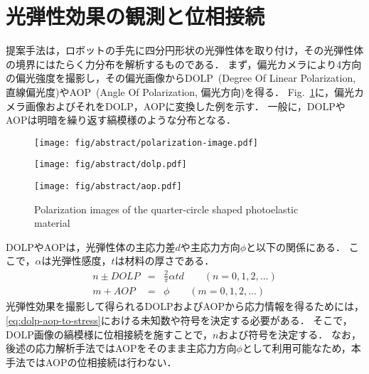 \documentclass[a4paper,papersize,dvipdfmx]{mtabst}
\newcommand{\figref}[1]{Fig.~\ref{#1}}
\begin{document}
\section{光弾性効果の観測と位相接続}
提案手法は，ロボットの手先に四分円形状の光弾性体を取り付け，その光弾性体の境界にはたらく力分布を解析するものである．
まず，偏光カメラにより4方向の偏光強度を撮影し，その偏光画像からDOLP~(Degree Of Linear Polarization, 直線偏光度)やAOP~(Angle Of Polarization, 偏光方向)を得る．
\figref{fig:polarization-map}に，偏光カメラ画像およびそれをDOLP，AOPに変換した例を示す．
一般に，DOLPやAOPは明暗を繰り返す縞模様のような分布となる．

\begin{figure}[b]
    \centering
    \begin{minipage}[t]{0.31\linewidth}
        \centering
        \texttt{[image: fig/abstract/polarization-image.pdf]}
    \end{minipage}
    \begin{minipage}[t]{0.32\linewidth}
        \centering
        \texttt{[image: fig/abstract/dolp.pdf]}
    \end{minipage}
    \begin{minipage}[t]{0.33\linewidth}
        \centering
        \texttt{[image: fig/abstract/aop.pdf]}
    \end{minipage}
\caption{Polarization images of the quarter-circle shaped photoelastic material}\label{fig:polarization-map}
\end{figure}

DOLPやAOPは，光弾性体の主応力差\(d\)や主応力方向\(\phi\)と以下の関係にある．
ここで，\(\alpha\)は光弾性感度，\(t\)は材料の厚さである．
\begin{eqnarray}\label{eq:dolp-aop-to-stress}
    n\pm DOLP&=&\frac{2}{\pi}\alpha td\qquad (n=0,1,2,\ldots) \\
    m+AOP&=&\phi\qquad (m=0,1,2,\ldots)
\end{eqnarray}
光弾性効果を撮影して得られるDOLPおよびAOPから応力情報を得るためには，\eqref{eq:dolp-aop-to-stress}における未知数や符号を決定する必要がある．
そこで，DOLP画像の縞模様に位相接続を施すことで，\(n\)および符号を決定する．
なお，後述の応力解析手法ではAOPをそのまま主応力方向\(\phi\)として利用可能なため，本手法ではAOPの位相接続は行わない．
\end{document}
